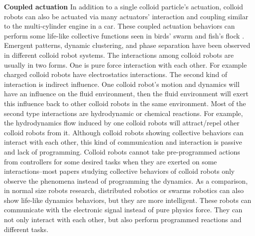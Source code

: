 \textbf{Coupled actuation}  In addition to a single colloid particle's actuation,  colloid robots can also be actuated via many actuators' interaction and coupling similar to the multi-cylinder engine in a car. These coupled actuation behaviors can perform some life-like collective functions seen in birds' swarm and fish's flock \cite{wang2015one,ginot2018aggregation}. Emergent patterns, dynamic clustering, and phase separation have been observed  in different colloid robot systems. \cite{buttinoni2013dynamical,ginot2018aggregation,duan2013transition,theurkauff2012dynamic} The interactions among colloid robots are usually in two forms. One is pure force interaction with each other. For example charged colloid robots have electrostatics interactions. \cite{dou2018emergence} The second kind of interaction is indirect influence. One colloid robot's motion and dynamics  will have an influence on the fluid environment, then  the fluid environment will exert this influence back to other colloid robots in the same environment. Most of the second type interactions are hydrodynamic or chemical reactions. For example, the hydrodynamics flow induced by one colloid robots will attract/repel other colloid robots from it. \cite{karani2019tuning} Although colloid robots showing collective behaviors can interact with each other, this kind of communication and interaction is passive and lack of programming. Colloid robots cannot take pre-programmed actions from controllers for some desired tasks when they are exerted on some interactions--most papers studying collective behaviors of colloid robots only observe the phenomena instead of  programming the dynamics.  As a comparison, in normal size robots research, distributed robotics or  swarms robotics\cite{wei2010sambot,arvin2014colias} can also show life-like dynamics behaviors, but they are more intelligent. These robots can communicate with the electronic signal instead of pure physics force. They can not only interact with each other, but also perform programmed reactions and different tasks.\cite{rubenstein2012kilobot,rubenstein2014programmable,li2019particle}

